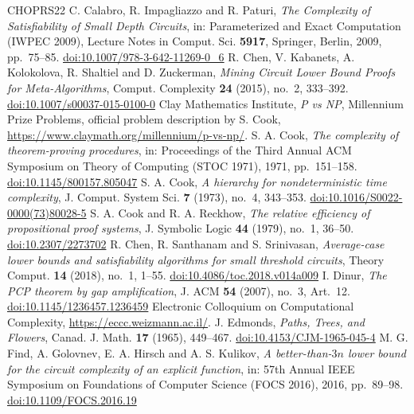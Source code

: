 \begin{thebibliography}{CHOPRS22}
 C. Calabro, R. Impagliazzo and R. Paturi, \emph{The Complexity of Satisfiability of Small Depth Circuits}, in: Parameterized and Exact Computation (IWPEC 2009), Lecture Notes in Comput. Sci. \textbf{5917}, Springer, Berlin, 2009, pp.~75--85. \href{https://doi.org/10.1007/978-3-642-11269-0_6}{doi:10.1007/978-3-642-11269-0\_6}
 R. Chen, V. Kabanets, A. Kolokolova, R. Shaltiel and D. Zuckerman, \emph{Mining Circuit Lower Bound Proofs for Meta-Algorithms}, Comput. Complexity \textbf{24} (2015), no.~2, 333--392. \href{https://doi.org/10.1007/s00037-015-0100-0}{doi:10.1007/s00037-015-0100-0}
 Clay Mathematics Institute, \emph{P vs NP}, Millennium Prize Problems, official problem description by S. Cook, \url{https://www.claymath.org/millennium/p-vs-np/}.
 S. A. Cook, \emph{The complexity of theorem-proving procedures}, in: Proceedings of the Third Annual ACM Symposium on Theory of Computing (STOC 1971), 1971, pp.~151--158. \href{https://doi.org/10.1145/800157.805047}{doi:10.1145/800157.805047}
 S. A. Cook, \emph{A hierarchy for nondeterministic time complexity}, J. Comput. System Sci. \textbf{7} (1973), no.~4, 343--353. \href{https://doi.org/10.1016/S0022-0000(73)80028-5}{doi:10.1016/S0022-0000(73)80028-5}
 S. A. Cook and R. A. Reckhow, \emph{The relative efficiency of propositional proof systems}, J. Symbolic Logic \textbf{44} (1979), no.~1, 36--50. \href{https://doi.org/10.2307/2273702}{doi:10.2307/2273702}
 R. Chen, R. Santhanam and S. Srinivasan, \emph{Average-case lower bounds and satisfiability algorithms for small threshold circuits}, Theory Comput. \textbf{14} (2018), no.~1, 1--55. \href{https://doi.org/10.4086/toc.2018.v014a009}{doi:10.4086/toc.2018.v014a009}
 I. Dinur, \emph{The PCP theorem by gap amplification}, J. ACM \textbf{54} (2007), no.~3, Art.~12. \href{https://doi.org/10.1145/1236457.1236459}{doi:10.1145/1236457.1236459}
 Electronic Colloquium on Computational Complexity, \url{https://eccc.weizmann.ac.il/}.
 J. Edmonds, \emph{Paths, Trees, and Flowers}, Canad. J. Math. \textbf{17} (1965), 449--467. \href{https://doi.org/10.4153/CJM-1965-045-4}{doi:10.4153/CJM-1965-045-4}
 M. G. Find, A. Golovnev, E. A. Hirsch and A. S. Kulikov, \emph{A better-than-$3n$ lower bound for the circuit complexity of an explicit function}, in: 57th Annual IEEE Symposium on Foundations of Computer Science (FOCS 2016), 2016, pp.~89--98. \href{https://doi.org/10.1109/FOCS.2016.19}{doi:10.1109/FOCS.2016.19}

\end{thebibliography}
